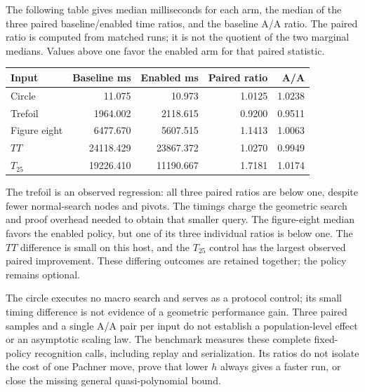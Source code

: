 The following table gives median milliseconds for each arm, the median
of the three paired baseline/enabled time ratios, and the baseline
A/A ratio.  The paired ratio is computed from matched runs; it is not
the quotient of the two marginal medians.  Values above one favor the
enabled arm for that paired statistic.
\begin{center}\small
\begin{tabular}{lrrrr}
\toprule
Input & Baseline ms & Enabled ms & Paired ratio & A/A\\
\midrule
Circle & 11.075 & 10.973 & 1.0125 & 1.0238\\
Trefoil & 1964.002 & 2118.615 & 0.9200 & 0.9511\\
Figure eight & 6477.670 & 5607.515 & 1.1413 & 1.0063\\
$TT$ & 24118.429 & 23867.372 & 1.0270 & 0.9949\\
$T_{25}$ & 19226.410 & 11190.667 & 1.7181 & 1.0174\\
\bottomrule
\end{tabular}
\end{center}

The trefoil is an observed regression: all three paired ratios are
below one, despite fewer normal-search nodes and pivots.  The timings
charge the geometric search and proof overhead needed to obtain that
smaller query.  The figure-eight median favors the enabled policy, but
one of its three individual ratios is below one.  The $TT$ difference
is small on this host, and the $T_{25}$ control has the largest observed
paired improvement.  These differing outcomes are retained together;
the policy remains optional.

The circle executes no macro search and serves as a protocol control;
its small timing difference is not evidence of a geometric performance
gain.  Three paired samples and a single A/A pair per input do not
establish a population-level effect or an asymptotic scaling law.
The benchmark measures these complete fixed-policy recognition calls,
including replay and serialization.  Its ratios do not isolate the
cost of one Pachner move, prove that lower $h$ always gives a faster
run, or close the missing general quasi-polynomial bound.
